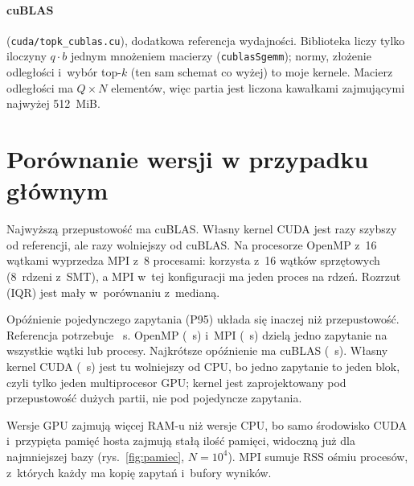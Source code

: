 \documentclass[11pt,a4paper]{article}
\begin{document}
\paragraph{cuBLAS} (\texttt{cuda/topk\_cublas.cu}), dodatkowa referencja wydajności. Biblioteka liczy tylko iloczyny $q\cdot b$ jednym mnożeniem macierzy (\texttt{cublasSgemm}); normy, złożenie odległości i~wybór top-$k$ (ten sam schemat co wyżej) to moje kernele. Macierz odległości ma $Q\times N$ elementów, więc partia jest liczona kawałkami zajmującymi najwyżej 512~MiB.

\section{Porównanie wersji w przypadku głównym}
\begin{table}[H]
\centering\small
\caption{Przypadek główny $N=10^5$, $D=128$, $Q=1000$, $k=10$. Mediana z 7 powtórzeń [IQR]; ostatnia kolumna to przyspieszenie względem referencji liczone z~czasu pełnego.}\label{tab:glowny}
\resizebox{\textwidth}{!}{}
\end{table}
Najwyższą przepustowość ma cuBLAS. Własny kernel CUDA jest \cudaDoRef{} razy szybszy od referencji, ale \cublasDoCuda{} razy wolniejszy od cuBLAS. Na procesorze OpenMP z~16 wątkami wyprzedza MPI z~8 procesami: korzysta z~16 wątków sprzętowych (8~rdzeni z~SMT), a MPI w~tej konfiguracji ma jeden proces na rdzeń. Rozrzut (IQR) jest mały w~porównaniu z~medianą.

Opóźnienie pojedynczego zapytania (P95) układa się inaczej niż przepustowość. Referencja potrzebuje \pRef{}~\textmu s. OpenMP (\pOmp{}~\textmu s) i~MPI (\pMpi{}~\textmu s) dzielą jedno zapytanie na wszystkie wątki lub procesy. Najkrótsze opóźnienie ma cuBLAS (\pCublas{}~\textmu s). Własny kernel CUDA (\pCuda{}~\textmu s) jest tu wolniejszy od CPU, bo jedno zapytanie to jeden blok, czyli tylko jeden multiprocesor GPU; kernel jest zaprojektowany pod przepustowość dużych partii, nie pod pojedyncze zapytania.

Wersje GPU zajmują więcej RAM-u niż wersje CPU, bo samo środowisko CUDA i~przypięta pamięć hosta zajmują stałą ilość pamięci, widoczną już dla najmniejszej bazy (rys.~\ref{fig:pamiec}, $N=10^4$). MPI sumuje RSS ośmiu procesów, z~których każdy ma kopię zapytań i~bufory wyników.
\end{document}
